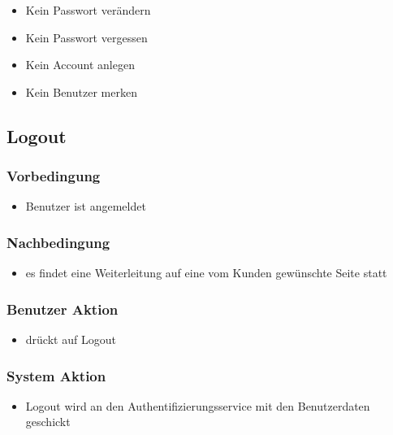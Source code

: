 \documentclass[a4paper,12pt]{article}
\begin{document}
\begin{itemize}
\item
  Kein Passwort verändern
\item
  Kein Passwort vergessen
\item
  Kein Account anlegen
\item
  Kein Benutzer merken
\end{itemize}

\subsection{Logout}\label{logout}

\subsubsection{Vorbedingung}\label{vorbedingung-1}

\begin{itemize}
\item
  Benutzer ist angemeldet
\end{itemize}

\subsubsection{Nachbedingung}\label{nachbedingung-1}

\begin{itemize}
\item
  es findet eine Weiterleitung auf eine vom Kunden gewünschte Seite
  statt
\end{itemize}

\subsubsection{Benutzer Aktion}\label{benutzer-aktion-1}

\begin{itemize}
\item
  drückt auf Logout
\end{itemize}

\subsubsection{System Aktion}\label{system-aktion-1}

\begin{itemize}
\item
  Logout wird an den Authentifizierungsservice mit den Benutzerdaten
  geschickt
\end{itemize}
\end{document}
